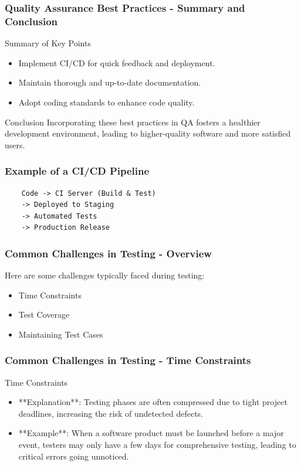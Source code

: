 \documentclass{beamer}
\begin{document}
\begin{frame}[fragile]
    \frametitle{Quality Assurance Best Practices - Summary and Conclusion}
    \begin{block}{Summary of Key Points}
        \begin{itemize}
            \item Implement CI/CD for quick feedback and deployment.
            \item Maintain thorough and up-to-date documentation.
            \item Adopt coding standards to enhance code quality.
        \end{itemize}
    \end{block}
    
    \begin{block}{Conclusion}
        Incorporating these best practices in QA fosters a healthier development environment, leading to higher-quality software and more satisfied users.
    \end{block}
\end{frame}

\begin{frame}[fragile]
    \frametitle{Example of a CI/CD Pipeline}
    \begin{lstlisting}
    Code -> CI Server (Build & Test) 
    -> Deployed to Staging 
    -> Automated Tests 
    -> Production Release
    \end{lstlisting}
\end{frame}

\begin{frame}[fragile]
    \frametitle{Common Challenges in Testing - Overview}
    Here are some challenges typically faced during testing:
    \begin{itemize}
        \item Time Constraints
        \item Test Coverage
        \item Maintaining Test Cases
    \end{itemize}
\end{frame}

\begin{frame}[fragile]
    \frametitle{Common Challenges in Testing - Time Constraints}
    \begin{block}{Time Constraints}
        \begin{itemize}
            \item **Explanation**: Testing phases are often compressed due to tight project deadlines, increasing the risk of undetected defects.
            \item **Example**: When a software product must be launched before a major event, testers may only have a few days for comprehensive testing, leading to critical errors going unnoticed.
        \end{itemize}
    \end{block}
\end{frame}
\end{document}

